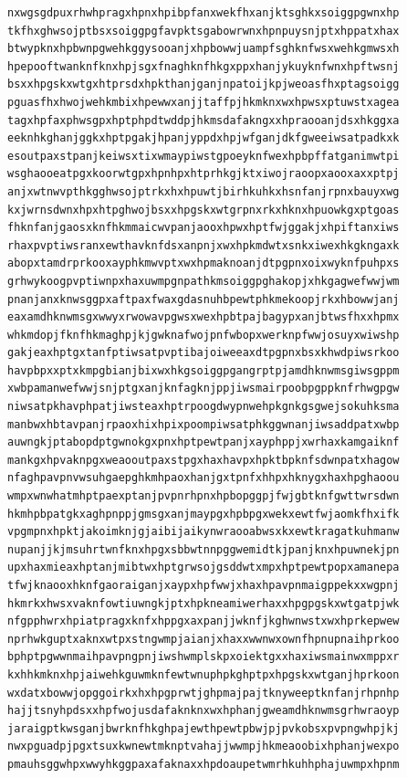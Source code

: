 \documentclass[11pt,letterpaper]{exam}
\begin{document}
\begin{questions}
\begin{verbatim}
nxwgsgdpuxrhwhpragxhpnxhpibpfanxwekfhxanjktsghkxsoiggpgwnxhp
tkfhxghwsojptbsxsoiggpgfavpktsgabowrwnxhpnpuysnjptxhppatxhax
btwypknxhpbwnpgwehkggysooanjxhpbowwjuampfsghknfwsxwehkgmwsxh
hpepooftwanknfknxhpjsgxfnaghknfhkgxppxhanjykuyknfwnxhpftwsnj
bsxxhpgskxwtgxhtprsdxhpkthanjganjnpatoijkpjweoasfhxptagsoigg
pguasfhxhwojwehkmbixhpewwxanjjtaffpjhkmknxwxhpwsxptuwstxagea
tagxhpfaxphwsgpxhptphpdtwddpjhkmsdafakngxxhpraooanjdsxhkggxa
eeknhkghanjggkxhptpgakjhpanjyppdxhpjwfganjdkfgweeiwsatpadkxk
esoutpaxstpanjkeiwsxtixwmaypiwstgpoeyknfwexhpbpffatganimwtpi
wsghaooeatpgxkoorwtgpxhpnhpxhtprhkgjktxiwojraoopxaooxaxxptpj
anjxwtnwvpthkgghwsojptrkxhxhpuwtjbirhkuhkxhsnfanjrpnxbauyxwg
kxjwrnsdwnxhpxhtpghwojbsxxhpgskxwtgrpnxrkxhknxhpuowkgxptgoas
fhknfanjgaosxknfhkmmaicwvpanjaooxhpwxhptfwjggakjxhpiftanxiws
rhaxpvptiwsranxewthavknfdsxanpnjxwxhpkmdwtxsnkxiwexhkgkngaxk
abopxtamdrprkooxayphkmwvptxwxhpmaknoanjdtpgpnxoixwyknfpuhpxs
grhwykoogpvptiwnpxhaxuwmpgnpathkmsoiggpghakopjxhkgagwefwwjwm
pnanjanxknwsggpxaftpaxfwaxgdasnuhbpewtphkmekoopjrkxhbowwjanj
eaxamdhknwmsgxwwyxrwowavpgwsxwexhpbtpajbagypxanjbtwsfhxxhpmx
whkmdopjfknfhkmaghpjkjgwknafwojpnfwbopxwerknpfwwjosuyxwiwshp
gakjeaxhptgxtanfptiwsatpvptibajoiweeaxdtpgpnxbsxkhwdpiwsrkoo
havpbpxxptxkmpgbianjbixwxhkgsoiggpgangrptpjamdhknwmsgiwsgppm
xwbpamanwefwwjsnjptgxanjknfagknjppjiwsmairpoobpgppknfrhwgpgw
niwsatpkhavphpatjiwsteaxhptrpoogdwypnwehpkgnkgsgwejsokuhksma
manbwxhbtavpanjrpaoxhixhpixpoompiwsatphkggwnanjiwsaddpatxwbp
auwngkjptabopdptgwnokgxpnxhptpewtpanjxayphppjxwrhaxkamgaiknf
mankgxhpvaknpgxweaooutpaxstpgxhaxhavpxhpktbpknfsdwnpatxhagow
nfaghpavpnvwsuhgaepghkmhpaoxhanjgxtpnfxhhpxhknygxhaxhpghaoou
wmpxwnwhatmhptpaexptanjpvpnrhpnxhpbopggpjfwjgbtknfgwttwrsdwn
hkmhpbpatgkxaghpnppjgmsgxanjmaypgxhpbpgxwekxewtfwjaomkfhxifk
vpgmpnxhpktjakoimknjgjaibijaikynwraooabwsxkxewtkragatkuhmanw
nupanjjkjmsuhrtwnfknxhpgxsbbwtnnpggwemidtkjpanjknxhpuwnekjpn
upxhaxmieaxhptanjmibtwxhptgrwsojgsddwtxmpxhptpewtpopxamanepa
tfwjknaooxhknfgaoraiganjxaypxhpfwwjxhaxhpavpnmaigppekxxwgpnj
hkmrkxhwsxvaknfowtiuwngkjptxhpkneamiwerhaxxhpgpgskxwtgatpjwk
nfgpphwrxhpiatpragxknfxhppgxaxpanjjwknfjkghwnwstxwxhprkepwew
nprhwkguptxaknxwtpxstngwmpjaianjxhaxxwwnwxownfhpnupnaihprkoo
bphptpgwwnmaihpavpngpnjiwshwmplskpxoiektgxxhaxiwsmainwxmppxr
kxhhkmknxhpjaiwehkguwmknfewtwnuphpkghptpxhpgskxwtganjhprkoon
wxdatxbowwjopggoirkxhxhpgprwtjghpmajpajtknyweeptknfanjrhpnhp
hajjtsnyhpdsxxhpfwojusdafaknknxwxhphanjgweamdhknwmsgrhwraoyp
jaraigptkwsganjbwrknfhkghpajewthpewtpbwjpjpvkobsxpvpngwhpjkj
nwxpguadpjpgxtsuxkwnewtmknptvahajjwwmpjhkmeaoobixhphanjwexpo
pmauhsggwhpxwwyhkggpaxafaknaxxhpdoaupetwmrhkuhhphajuwmpxhpnm

\end{verbatim}
\end{questions}
\end{document}
